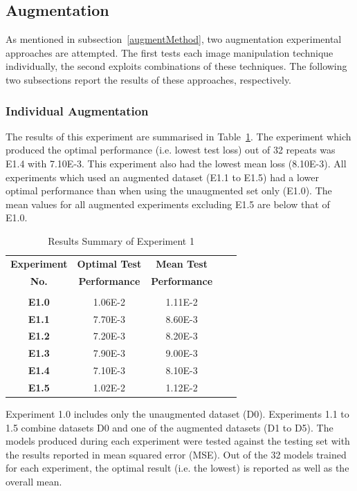\subsection{Augmentation} \label{augmentResults}

As mentioned in subsection~\ref{augmentMethod}, two augmentation experimental approaches are attempted. The first tests each image manipulation technique individually, the second exploits combinations of these techniques. The following two subsections report the results of these approaches, respectively.

\subsubsection{Individual Augmentation} \label{SingleAug}

The results of this experiment are summarised in Table~\ref{tab:Experiment1results}. The experiment which produced the optimal performance (i.e. lowest test loss) out of 32 repeats was E1.4 with 7.10E-3. This experiment also had the lowest mean loss (8.10E-3). All experiments which used an augmented dataset (E1.1 to E1.5) had a lower optimal performance than when using the unaugmented set only (E1.0). The mean values for all augmented experiments excluding E1.5 are below that of E1.0. 

\begin{table}[h!]
	 \begin{center}
		
		\begin{tabular}{c|c|c|r|c} %
			\textbf{Experiment} & \textbf{Optimal Test} & \textbf{Mean Test}  \\
			
			\textbf{No.} & \textbf{Performance} & \textbf{Performance}  \\
			
			\hline
			& & \\
			\textbf{E1.0} & 1.06E-2 & 1.11E-2 \\
			\textbf{E1.1} & 7.70E-3 & 8.60E-3 \\ 
			\textbf{E1.2} & 7.20E-3 & 8.20E-3 \\
			\textbf{E1.3} & 7.90E-3 & 9.00E-3 \\
			\textbf{E1.4} & 7.10E-3 & 8.10E-3 \\
			\textbf{E1.5} & 1.02E-2 & 1.12E-2 \\ 
			
		\end{tabular}
		\caption{Results Summary of Experiment 1} {Experiment 1.0 includes only the unaugmented dataset (D0). Experiments 1.1 to 1.5 combine datasets D0 and one of the augmented datasets (D1 to D5). The models produced during each experiment were tested against the testing set with the results reported in mean squared error (MSE). Out of the 32 models trained for each experiment, the optimal result (i.e. the lowest) is reported as well as the overall mean.}
		\label{tab:Experiment1results}
		 \end{center}
\end{table}

